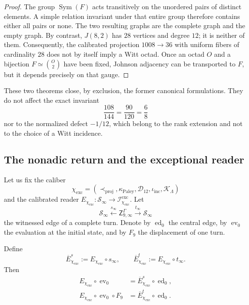 \begin{proof}
The group \(\operatorname{Sym}(F)\) acts transitively on the unordered pairs
of distinct elements. A simple relation invariant under that entire group
therefore contains either all pairs or none. The two resulting graphs are
the complete graph and the empty graph. By contrast, \(J(8,2)\) has \(28\) vertices and
degree \(12\); it is neither of them. Consequently, the calibrated projection
\(1008\to36\) with uniform fibers of cardinality \(28\) does not by
itself imply a Witt octad. Once an octad \(O\) and a bijection
\(F\simeq\binom{O}{2}\) have been fixed, Johnson adjacency can be transported to \(F\),
but it depends precisely on that gauge.
\end{proof}

These two theorems close, by exclusion, the former canonical
formulations. They do not affect the exact invariant
\[
 \frac{108}{144}=\frac{90}{120}=\frac68
\]
nor to the normalized defect \(-1/12\), which belong to the rank extension
and not to the choice of a Witt incidence.

\subsection{The nonadic return and the exceptional reader}

Let us fix the caliber
\[
 \chi_{\mathrm{exc}}
 =(
 \prec_{\mathrm{proj}},
 \kappa_{\mathrm{Paley}},
 \mathcal D_{12},
 \iota_{\mathrm{inc}},
 \mathcal K_{\Lambda})
\]
and the calibrated reader
\(E_{\chi_{\mathrm{exc}}}:\mathscr S_\infty
\to\mathcal I^{\mathrm{exc}}_{\chi_{\mathrm{exc}}}\).
Let
\[
 \mathscr S_\infty\xleftarrow{s_\infty}
 \mathsf Z^{\Gamma}_{9,\infty}
 \xrightarrow{t_\infty}\mathscr S_\infty
\]
the witnessed edge of a complete turn. Denote by
\(\operatorname{ed}_0\) the central edge, by \(\operatorname{ev}_0\) the
evaluation at the initial state, and by \(F_9\) the displacement of one turn.

\begin{theorem}
\label{thm:hmt-final-factorizacion-gamma-nueve}
Define
\[
 \overline E^{s}_{\chi_{\mathrm{exc}}}
 :=E_{\chi_{\mathrm{exc}}}\circ s_\infty,
 \qquad
 \overline E^{t}_{\chi_{\mathrm{exc}}}
 :=E_{\chi_{\mathrm{exc}}}\circ t_\infty.
\]
Then
\begin{align}
 E_{\chi_{\mathrm{exc}}}\circ\operatorname{ev}_0
 &=\overline E^{s}_{\chi_{\mathrm{exc}}}
   \circ\operatorname{ed}_0,
 \label{eq:hmt-final-factorizacion-gamma-fuente}\\
 E_{\chi_{\mathrm{exc}}}\circ\operatorname{ev}_0\circ F_9
 &=\overline E^{t}_{\chi_{\mathrm{exc}}}
   \circ\operatorname{ed}_0.
 \label{eq:hmt-final-factorizacion-gamma-destino}
\end{align}
\end{theorem}

